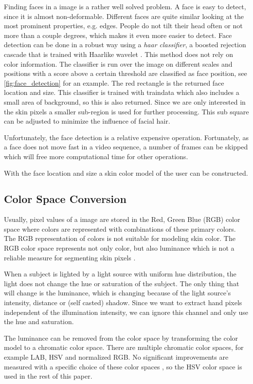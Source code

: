 Finding faces in a image is a rather well solved problem. A face is easy to detect, since it is almost non-deformable. Different faces are quite similar looking at the most prominent properties, e.g. edges. People do not tilt their head often or not more than a couple degrees, which makes it even more easier to detect. Face detection can be done in a robust way using a \emph{haar classifier}, a boosted rejection cascade that is trained with Haar\-like wavelet \citep{Viola2001,Viola2004}. This  method does not rely on color information. The classifier is run over the image on different scales and positions with a score above a certain threshold are classified as face position, see \autoref{fig:face_detection} for an example. The red rectangle is the returned face location and size. This classifier is trained with traindata which also includes a small area of background, so this is also returned. Since we are only interested in the skin pixels a smaller sub-region is used for further processing. This sub square can be adjusted to minimize the influence of facial hair. 

Unfortunately, the face detection is a relative expensive operation. Fortunately, as a face does not move fast in a video sequence, a number of frames can be skipped which will free more computational time for other operations.

With the face location and size a skin color model of the user can be constructed.

\subsection*{Color Space Conversion}
Usually, pixel values of a image are stored in the Red, Green Blue (RGB) color space where colors are represented with combinations of these primary colors. The RGB representation of colors is not suitable for modeling skin color. The RGB color space represents not only color, but also luminance which is not a reliable measure for segmenting skin pixels \citep{Cai1999}.

When a subject is lighted by a light source with uniform hue distribution, the light does not change the hue or saturation of the subject. The only thing that will change is the luminance, which is changing because of the light source's intensity, distance or (self casted) shadow. Since we want to extract hand pixels independent of the illumination intensity, we can ignore this channel and only use the hue and saturation.

The luminance can be removed from the color space by transforming the color model to a chromatic color space. There are multiple chromatic color spaces, for example LAB, HSV and normalized RGB. No significant improvements are measured with a specific choice of these color spaces \citep{vsa03survey, Bradski1998}, so the HSV color space is used in the rest of this paper.

